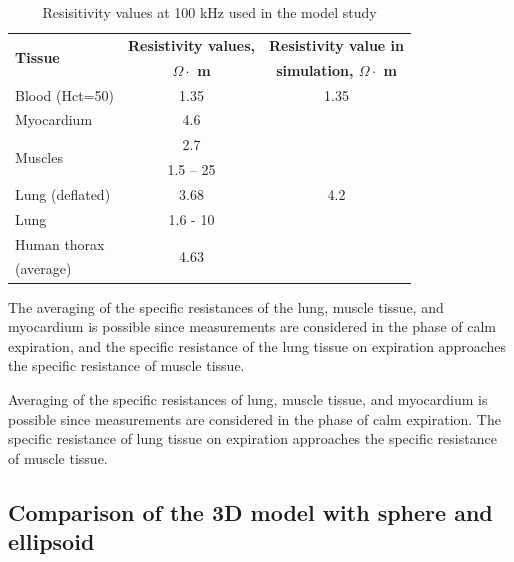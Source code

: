 \documentclass[conference]{IEEEtran}
\begin{document}
\begin{table}[htbp]
    \caption{Resisitivity values at  100 kHz used in the model study}
    \begin{center}
        \begin{tabular}{|l|c|c|}
            \hline
            \multirow{2}{*}{\textbf{Tissue}}              &     \textbf{Resistivity values,}      &    \textbf{Resistivity value in}  \\
            &   \textbf{$\Omega \cdot$ m}     &   \textbf{ simulation, $\Omega \cdot$ m} \\
            \hline
            Blood (Hct=50)           & 1.35\cite{Hill1975}           & 1.35      \\
            \hline
            Myocardium               & 4.6 \cite{Hasgall}       & \multirow{7}{*}{4.2}\\
            \cline{1-2}
            \multirow{2}{*}{Muscles} & 2.7 \cite{Hasgall}           &     \\
            \cline{2-2}
            & 1.5 – 25 \cite{Rush1963}           &   \\
            \cline{1-2}
            Lung (deflated)          & 3.68 \cite{Hasgall}     &         \\
            \cline{1-2}
            Lung                     & 1.6 - 10 \cite{Grimnes2008}       &    \\
            \cline{1-2}
            Human thorax & \multirow{2}{*}{4.63 \cite{Rush1963} }  &   \\
            (average)   & &   \\
            \hline
        \end{tabular}
        \label{tab:table}
    \end{center}
\end{table}

The averaging of the specific resistances of the lung, muscle tissue, and
myocardium is possible since measurements are considered in the phase of calm
expiration, and the specific resistance of the lung tissue on expiration
approaches the specific resistance of muscle tissue.

Averaging of the specific resistances of lung, muscle tissue, and myocardium is possible since measurements are considered in the phase of calm expiration.
The specific resistance of lung tissue on expiration approaches the specific resistance of muscle tissue.

\subsection{Comparison of the 3D model with sphere and ellipsoid}
\end{document}
